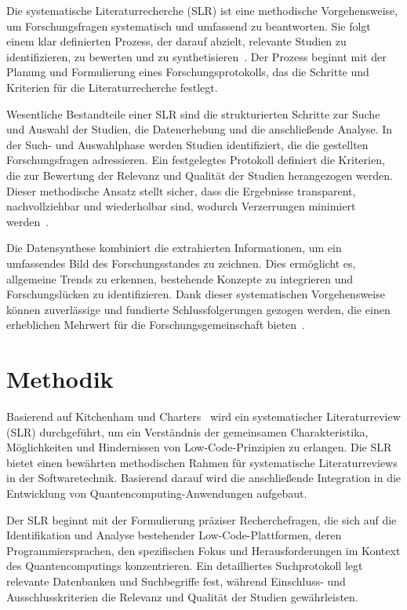 Die systematische Literaturrecherche (SLR) ist eine methodische Vorgehensweise, um Forschungsfragen 
systematisch und umfassend zu beantworten. Sie folgt einem klar definierten Prozess, der darauf abzielt, 
relevante Studien zu identifizieren, zu bewerten und zu synthetisieren~\cite{kitchenham2007guidelines}. 
Der Prozess beginnt mit der Planung und Formulierung eines Forschungsprotokolls, das die Schritte und 
Kriterien für die Literaturrecherche festlegt.

Wesentliche Bestandteile einer SLR sind die strukturierten Schritte zur Suche und Auswahl der Studien, 
die Datenerhebung und die anschließende Analyse. In der Such- und Auswahlphase werden Studien identifiziert, 
die die gestellten Forschungsfragen adressieren. Ein festgelegtes Protokoll definiert die Kriterien, die 
zur Bewertung der Relevanz und Qualität der Studien herangezogen werden. Dieser methodische Ansatz stellt 
sicher, dass die Ergebnisse transparent, nachvollziehbar und wiederholbar sind, wodurch Verzerrungen 
minimiert werden~\cite{okoli2015guide}.

Die Datensynthese kombiniert die extrahierten Informationen, um ein umfassendes Bild des Forschungsstandes 
zu zeichnen. Dies ermöglicht es, allgemeine Trends zu erkennen, bestehende Konzepte zu integrieren und 
Forschungslücken zu identifizieren. Dank dieser systematischen Vorgehensweise können zuverlässige und 
fundierte Schlussfolgerungen gezogen werden, die einen erheblichen Mehrwert für 
die Forschungsgemeinschaft bieten~\cite{petersen2008systematic}.

\section{Methodik}
Basierend auf Kitchenham und Charters~\cite{kitchenham2007guidelines} wird ein systematischer 
Literaturreview (SLR) durchgeführt, um ein Verständnis der gemeinsamen Charakteristika, Möglichkeiten 
und Hindernissen von Low-Code-Prinzipien zu erlangen. Die SLR bietet einen bewährten methodischen 
Rahmen für systematische Literaturreviews in der Softwaretechnik. Basierend darauf wird die 
anschließende Integration in die Entwicklung von Quantencomputing-Anwendungen aufgebaut.

Der SLR beginnt mit der Formulierung präziser Recherchefragen, die sich auf die 
Identifikation und Analyse bestehender Low-Code-Plattformen, deren Programmiersprachen, 
den spezifischen Fokus und Herausforderungen im Kontext des Quantencomputings 
konzentrieren. Ein detailliertes Suchprotokoll legt relevante Datenbanken und 
Suchbegriffe fest, während Einschluss- und Ausschlusskriterien die Relevanz und Qualität 
der Studien gewährleisten.

